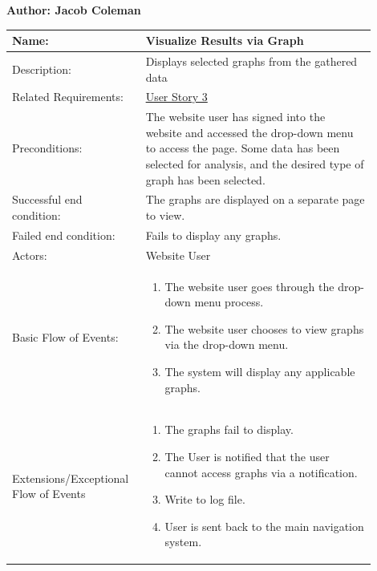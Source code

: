 \documentclass[11pt]{article}
\begin{document}
\begin{table}[!ht]
\begin{center}
\textbf{Author: Jacob Coleman}
\vspace*{1em}

\begin{tabular}{p{0.30\linewidth}p{0.60\linewidth}}
	Name: & Visualize Results via Graph\\\hline
	Description: & Displays selected graphs from the gathered data\\\hline
	Related Requirements:& \hyperlink{us3}{User Story 3}\\\hline
	Preconditions:& The website user has signed into the website and accessed the drop-down menu to access the page. Some data has been selected for analysis, and the desired type of graph has been selected.\\\hline
	Successful end condition:& The graphs are displayed on a separate page to view.\\\hline
	Failed end condition:& Fails to display any graphs.\\\hline
	Actors:& Website User\\\hline
	Basic Flow of Events: & \begin{enumerate}
	\item The website user goes through the drop-down menu process.
	\item The website user chooses to view graphs via the drop-down menu.
	\item The system will display any applicable graphs.
	\end{enumerate}\\\hline
	Extensions/Exceptional Flow of Events & \begin{enumerate}
	\item The graphs fail to display.
	\item The User is notified that the user cannot access graphs via a notification.
	\item Write to log file.
	\item User is sent back to the main navigation system.
	\end{enumerate}
\end{tabular}
\label{des:vis_res}	
\end{center}
\end{table}
\end{document}
